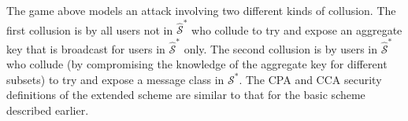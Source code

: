 The game above models an attack involving two different kinds of collusion. The first collusion is by all users not in $\hat{{\mathcal{S}}}^{*}$ who collude to try and expose an aggregate key that is broadcast for users in $\hat{{\mathcal{S}}}^{*}$ only. The second collusion is by users in $\hat{{\mathcal{S}}}^{*}$ who collude (by compromising the knowledge of the aggregate key for different subsets) to try and expose a message class in ${{\mathcal{S}}}^{*}$. The CPA and CCA security definitions of the extended scheme are similar to that for the basic scheme described earlier. 
% 
% 
% 
%  
%  
